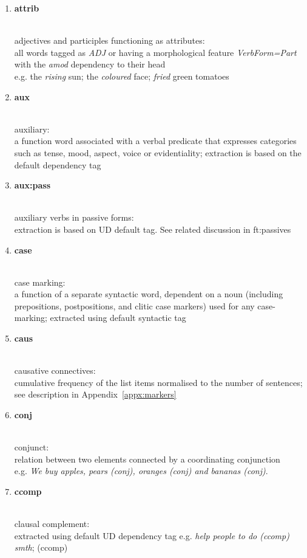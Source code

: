 \begin{enumerate}
	\item \hypertarget{ft:attrib}{\textbf{attrib}} \\
		adjectives and participles functioning as attributes: \\
		all words tagged as \textit{ADJ} or having a morphological feature \textit{VerbForm=Part} with the \textit{amod} dependency to their head \\
		e.g. the \textit{rising} sun; the \textit{coloured} face; \textit{fried} green tomatoes
	
	\item \hypertarget{ft:aux}{\textbf{aux}} \\
		auxiliary: \\
		a function word associated with a verbal predicate that expresses categories such as tense, mood, aspect, voice or evidentiality; extraction is based on the default dependency tag
		
	\item \hypertarget{ft:aux:pass}{\textbf{aux:pass}} \\
		auxiliary verbs in passive forms: \\ 
		extraction is based on UD default tag. See related discussion in \hypertarget{ft:passives}{ft:passives}
	
	\item \hypertarget{ft:case}{\textbf{case}} \\
		case marking: \\
		a function of a separate syntactic word, dependent on a noun (including prepositions, postpositions, and clitic case markers) used for any case-marking; extracted using default syntactic tag 
		
	\item \hypertarget{ft:caus}{\textbf{caus}} \\
		causative connectives: \\
		cumulative frequency of the list items normalised to the number of sentences; see description in Appendix~\ref{appx:markers}
	
	\item \hypertarget{ft:cc}{\textbf{conj}} \\
		conjunct: \\
		relation between two elements connected by a coordinating conjunction \\
		e.g. \textit{We buy apples, pears (conj), oranges (conj) and bananas (conj)}. 
	
	\item \hypertarget{ft:ccomp}{\textbf{ccomp}} \\
		clausal complement: \\
		extracted using default UD dependency tag
		e.g. \textit{help people to do (ccomp) smth};  (ccomp)
	

\end{enumerate}
